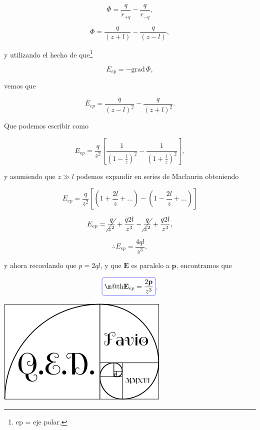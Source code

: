 \documentclass[a4paper,11pt]{article}
\makeatletter
\numberwithin{equation}{section}
\newcommand*{\boxcolor}{blue}
\renewcommand{\boxed}[1]{\textcolor{\boxcolor}{%
\tikz[baseline={([yshift=-1ex]current bounding box.center)}] \node [rectangle, minimum width=1ex,rounded corners,draw] {\normalcolor\m@th$\displaystyle#1$};}}
\makeatother
\begin{document}
\begin{equation}
 \Phi = \frac{q}{r_{+q}} - \frac{q}{r_{-q}},
\end{equation}

\begin{equation}
 \Phi = \frac{q}{(z + l)} - \frac{q}{(z - l)},
\end{equation}

y utilizando el hecho de que\footnote{ep = eje polar.} 

\begin{equation}
 E_{ep} = - \text{grad} \, \Phi,
\end{equation}

vemos que 

\begin{equation}
 E_{ep} = \frac{q}{(z - l)^2} - \frac{q}{(z + l)^2}.
\end{equation}

Que podemos escribir como 

\begin{equation}
 E_{ep} = \frac{q}{z^2}\left[\frac{1}{\left(1 - \frac{l}{z}\right)^2} - 
 \frac{1}{\left(1 + \frac{l}{z}\right)^2}\right],
\end{equation}

y asumiendo que $z \gg l$ podemos expandir en series de Maclaurin obteniendo 

\begin{equation}
 E_{ep} = \frac{q}{z^2}\left[\left(1 + \frac{2l}{z} + \dots \right) - 
 \left(1 - \frac{2l}{z} + \dots \right) \right]
\end{equation}

\begin{equation}
 E_{ep} = \cancel{\frac{q}{z^2}} + \frac{q2l}{z^3} - \cancel{\frac{q}{z^2}} +
 \frac{q2l}{z^3},
\end{equation}

\begin{equation}
 \therefore E_{ep} = \frac{4ql}{z^3},
\end{equation}

y ahora recordando que $p = 2ql$, y que $\mathbf{E}$ es paralelo a $\mathbf{p}$, 
encontramos que 

\begin{equation}
 \boxed{\mathbf{E}_{ep} = \frac{2\mathbf{p}}{z^3}}.
\end{equation}

\hspace{10cm}\includegraphics[scale=0.25]{logoQED}
\end{document}
